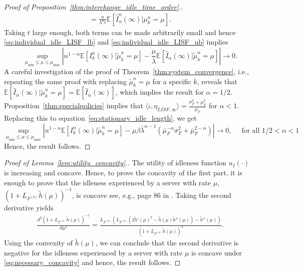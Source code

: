 \documentclass[a4paper,11pt,twoside]{article}
\numberwithin{equation}{section}
\numberwithin{figure}{section}
\theoremstyle{plain}
\newcommand{\EE}{\mathbb{E}}
\newcommand{\1}{\mathbbm{1}}
\begin{document}
\begin{proof}[Proof of Proposition~\ref{thm:interchange_idle_time_order}.]
\begin{align*}
     =\frac{n}{\lambda^nt}\EE\left[\hat{I}_\alpha^n(\infty)|\mu_k^n=\mu\right].
 \end{align*}
Taking $t$ large enough, both terms can be made arbitrarily small and hence \eqref{eq:individual_idle_LISF_lb} and \eqref{eq:individual_idle_LISF_ub} implies
\[
 \sup_{\mu_{\min}\leq \mu\leq \mu_{\max}}\left|n^{1-\alpha}\EE[I_k^n(\infty)|\tilde{\mu}_k^n=\mu]- \frac{\mu}{\bar{\lambda}}\EE[\hat{I}_\alpha(\infty)|\tilde{\mu}_k^n=\mu]\right|\to 0.
\]
A careful investigation of the proof of Theorem~\ref{thm:system_convergence}, i.e., repeating the same proof with replacing $\tilde{\mu}_k^n=\mu$ for a specific $k$, reveals that $\EE[\hat{I}_\alpha(\infty)|\tilde{\mu}_k^n=\mu] = \EE[\hat{I}_\alpha(\infty)]$, which implies the result for $\alpha=1/2$. Proposition~\ref{thm:specialpolicies} implies that $\langle \iota, \eta_{LISF,\infty}\rangle =\frac{\sigma_F^2 + \mu_F^2}{\mu_F}$ for $\alpha<1$. Replacing this to equation~\eqref{eq:stationary_idle_length}, we get
\[
\sup_{\mu_{\min}\leq \mu\leq \mu_{\max}}\left|n^{1-\alpha}\EE[I_k^n(\infty)|\tilde{\mu}_k^n=\mu]- \mu\beta\bar{\lambda}^{\alpha-1}(\bar{\mu}_F^{-\alpha}\sigma_F^2+\bar{\mu}_F^{2-\alpha})\right|\to 0,\quad \mbox{ for all }1/2< \alpha<1
\]
Hence, the result follows. \end{proof}

\begin{proof}[Proof of Lemma~\ref{lem:utility_concavity}.]
The utility of idleness function $u_I(\cdot)$ is increasing and concave.  Hence, to prove the concavity of the first part, it is enough to prove that the idleness experienced by a server with rate $\mu$, $(1+L_{F^{(0)}}\tilde{h}(\mu))^{-1}$, is concave see, e.g., page 86 in \cite{boydvandenberghe2004}. Taking the second derivative yields 
\begin{align*}
    \frac{d^2(1+L_{F^{(0)}}\tilde{h}(\mu))^{-1}}{d\mu^2}=\frac{L_{F^{(0)}}(L_{F^{(0)}}(2\tilde{h}'(\mu)^2-\tilde{h}(\mu)\tilde{h}''(\mu))-\tilde{h}''(\mu))}{(1+L_{F^{(0)}}\tilde{h}(\mu))^3}.
\end{align*}
Using the convexity of $\tilde{h}(\mu)$, we can conclude that the second derivative is negative for the idleness experienced by a server with rate $\mu$ is concave under \eqref{eq:necessary_concavity} and hence, the result follows.   \end{proof}
\end{document}
